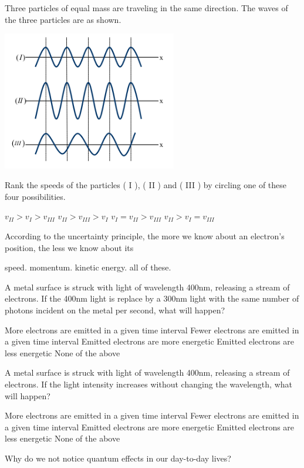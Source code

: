 \documentclass[12pt]{exam}
\begin{document}
\begin{questions}
	\question Three particles of equal mass are traveling in the same direction. The waves of
the three particles are as shown.
	\begin{center}
		\includegraphics[width=3in]{../images/deBroglie.png}
	\end{center}
	Rank the speeds of the particles ( I ), ( II ) and ( III ) by circling one of these four possibilities.
\begin{choices}
	\choice $v_{II} > v_I > v_{III}$
	\choice $v_{II} > v_{III} > v_I$
	\choice $v_{I} = v_{II} > v_{III}$
	\choice $v_{II} > v_I = v_{III}$
\end{choices}

	\question According to the uncertainty principle, the more we know about an electron's position,
the less we know about its
\begin{choices}
	\choice speed.
	\choice momentum.
	\choice kinetic energy.
	\choice all of these.
\end{choices}

	\question A metal surface is struck with light of wavelength 400nm, releasing a stream of electrons. If the 400nm light is replace by a 300nm light with the same number of photons incident on the metal per second, what will happen?
\begin{choices}
\choice More electrons are emitted in a given time interval
\choice Fewer electrons are emitted in a given time interval
\choice Emitted electrons are more energetic
\choice Emitted electrons are less energetic
\choice None of the above
\end{choices}

\question A metal surface is struck with light of wavelength 400nm, releasing a stream of electrons. If the light intensity increases without changing the wavelength, what will happen?
\begin{choices}
\choice More electrons are emitted in a given time interval
\choice Fewer electrons are emitted in a given time interval
\choice Emitted electrons are more energetic
\choice Emitted electrons are less energetic
\choice None of the above
\end{choices}
	
	\question Why do we not notice quantum effects in our day-to-day lives?	
		\vspace{0.5in}	
	
\end{questions}
\end{document}
